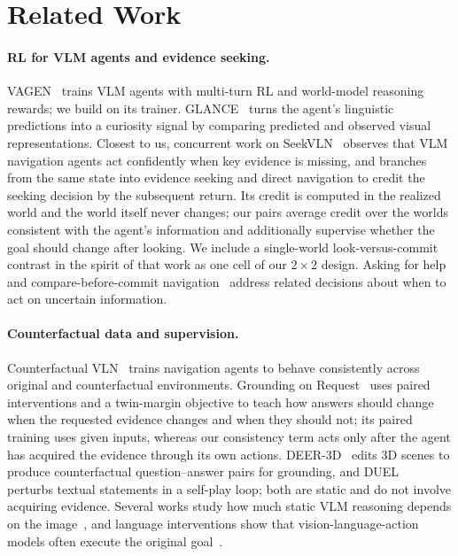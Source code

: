 \section{Related Work}
\label{sec:related}

\paragraph{RL for VLM agents and evidence seeking.}
VAGEN~\cite{vagen2025} trains VLM agents with multi-turn RL and world-model reasoning rewards; we build on its trainer.
GLANCE~\cite{glance2026} turns the agent's linguistic predictions into a curiosity signal by comparing predicted and observed visual representations.
Closest to us, concurrent work on SeekVLN~\cite{seekvln2026} observes that VLM navigation agents act confidently when key evidence is missing, and branches from the same state into evidence seeking and direct navigation to credit the seeking decision by the subsequent return.
Its credit is computed in the realized world and the world itself never changes; our pairs average credit over the worlds consistent with the agent's information and additionally supervise whether the goal should change after looking.
We include a single-world look-versus-commit contrast in the spirit of that work as one cell of our $2{\times}2$ design.
Asking for help~\cite{askforhelp2025} and compare-before-commit navigation~\cite{c2nav2026} address related decisions about when to act on uncertain information.

\paragraph{Counterfactual data and supervision.}
Counterfactual VLN~\cite{counterfactualvln2020} trains navigation agents to behave consistently across original and counterfactual environments.
Grounding on Request~\cite{groundingonrequest2026} uses paired interventions and a twin-margin objective to teach how answers should change when the requested evidence changes and when they should not; its paired training uses given inputs, whereas our consistency term acts only after the agent has acquired the evidence through its own actions.
DEER-3D~\cite{deer3d2025} edits 3D scenes to produce counterfactual question--answer pairs for grounding, and DUEL~\cite{duel2026} perturbs textual statements in a self-play loop; both are static and do not involve acquiring evidence.
Several works study how much static VLM reasoning depends on the image~\cite{thinkingdeltas2026,morethinking2025}, and language interventions show that vision-language-action models often execute the original goal~\cite{encodednotcontrol2026}.

